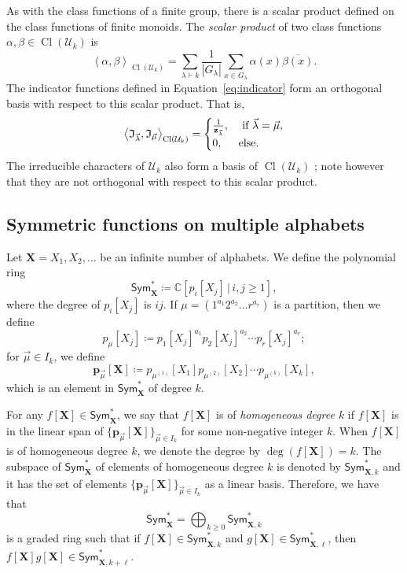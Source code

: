 \documentclass[ALCO,Unicode]{cedram}
\newcommand{\defncolor}{\color{darkred}}
\newcommand{\defn}[1]{{\defncolor\emph{#1}}} %
\newcommand{\CC}{\mathbb C}
\newcommand{\ind}{\mathfrak{I}}
\newcommand{\XXX}{\mathbf{X}}
\newcommand{\class}{\operatorname{Cl}}
\begin{document}
As with the class functions of a finite group, there is a scalar product
defined on the class functions of finite monoids.
The \defn{scalar product} of two class functions $\alpha, \beta \in \class(\mathcal{U}_k)$
is
\begin{equation}\label{eq:defspclass}
\left< \alpha, \beta \right>_{\class(\mathcal{U}_k)} =
\sum_{\lambda \vdash k} \frac{1}{|G_{\lambda}|} \sum_{x \in G_{\lambda}} \alpha(x) \overline{\beta(x)}.
\end{equation}
The indicator functions defined in Equation~\ref{eq:indicator} form an orthogonal basis
with respect to this scalar product.  That is,
$$
    \left< \ind_{\vec{\lambda}}, \ind_{\vec{\mu}} \right>_{\class(\mathcal{U}_k)}
    = \begin{cases}\frac{1}{\mathbf{z}_{\vec{\lambda}}}, &\hbox{ if }\vec{\lambda} = \vec{\mu},\\
    0, & \hbox{else.}\end{cases}
$$
The irreducible characters of $\mathcal{U}_k$ also form a basis of $\class(\mathcal{U}_k)$
\cite[Proposition 7.9 and 7.10]{Steinberg.2016};
note however that they are not orthogonal with respect to this
scalar product.

\subsection{Symmetric functions on multiple alphabets}
Let $\XXX = X_1, X_2, \ldots$ be an infinite number of alphabets.  We define the polynomial ring
\[
    \mathsf{Sym}^\ast_\XXX \coloneqq \CC[p_i[X_j]\, |\, i,j\geqslant 1],
\]
where the degree of $p_i[X_j]$ is $ij$.  If $\mu = (1^{a_1}2^{a_2}\ldots r^{a_r})$ is a partition,
then we define
$$p_\mu[X_j] \coloneqq p_1[X_j]^{a_1} p_2[X_j]^{a_2} \cdots p_r[X_j]^{a_r};$$
for $\vec{\mu} \in I_k$, we define
$$\mathbf{p}_{\vec{\mu}}[\XXX] \coloneqq p_{\mu^{(1)}}[X_1] p_{\mu^{(2)}}[X_2] \cdots p_{\mu^{(k)}}[X_k],$$
which is an element in $\mathsf{Sym}^\ast_\XXX$ of degree $k$.

For any $f[\XXX] \in \mathsf{Sym}^\ast_\XXX$, we say that $f[\XXX]$ is of \defn{homogeneous
degree $k$} if
$f[\XXX]$ is in the linear span of $\{ \mathbf{p}_{\vec{\mu}}[\XXX] \}_{\vec{\mu} \in I_k}$
for some non-negative integer $k$.
When $f[\XXX]$ is of homogeneous degree $k$, we denote the degree by $\deg(f[\XXX]) = k$.
The subspace of $\mathsf{Sym}^\ast_\XXX$ of elements of homogeneous degree $k$ is denoted by
$\mathsf{Sym}^\ast_{\XXX,k}$ and it has the set of elements $\{ \mathbf{p}_{\vec{\mu}}[\XXX] \}_{\vec{\mu} \in I_k}$ as a linear basis. Therefore, we have that
\[
    \mathsf{Sym}^\ast_\XXX = \bigoplus_{k \geqslant 0} \mathsf{Sym}^\ast_{\XXX,k}
\]
is a graded ring such that if $f[\XXX] \in \mathsf{Sym}^\ast_{\XXX,k}$ and $g[\XXX] \in \mathsf{Sym}^\ast_{\XXX,\ell}$, then $f[\XXX] g[\XXX] \in 
\mathsf{Sym}^\ast_{\XXX,k+\ell}$.
\end{document}
